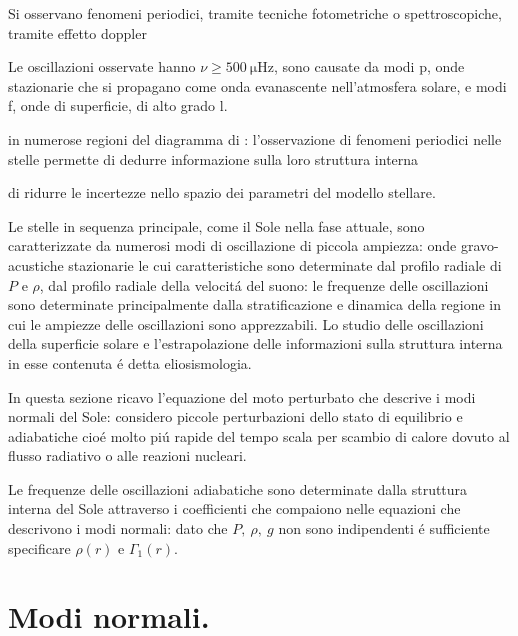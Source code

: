 \documentclass[../main.tex]{subfiles}
\begin{document}
\begin{workout}
Si osservano fenomeni periodici, tramite tecniche fotometriche o spettroscopiche, tramite effetto doppler

Le oscillazioni osservate hanno $\nu\geq\SI{500}{\micro\hertz}$, sono causate da modi p, onde stazionarie che si propagano come onda evanascente nell'atmosfera solare, e modi f, onde di superficie, di alto grado l.

\end{workout}

\begin{workout}
 in numerose regioni del diagramma di \hr{}: l'osservazione di fenomeni periodici nelle stelle permette di dedurre informazione sulla loro struttura interna
\end{workout}

\begin{workout}
  di ridurre le incertezze nello spazio dei parametri del modello stellare.
\end{workout}

Le stelle in sequenza principale, come il Sole nella fase attuale, sono caratterizzate da numerosi modi di oscillazione di piccola ampiezza: onde gravo-acustiche stazionarie le cui caratteristiche sono determinate dal profilo radiale di $P$ e $\rho$, dal profilo radiale della velocit\'a del suono: le frequenze delle oscillazioni sono determinate principalmente dalla stratificazione e dinamica della regione in cui le ampiezze delle oscillazioni sono apprezzabili. Lo studio delle oscillazioni della superficie solare e l'estrapolazione delle informazioni sulla struttura interna in esse contenuta \'e detta eliosismologia.

In questa sezione ricavo l'equazione del moto perturbato che descrive i modi normali del Sole: considero piccole perturbazioni dello stato di equilibrio e adiabatiche cio\'e molto pi\'u rapide del tempo scala per scambio di calore dovuto al flusso radiativo o alle reazioni nucleari.

Le frequenze delle oscillazioni adiabatiche sono determinate dalla struttura interna del Sole attraverso i coefficienti che compaiono nelle equazioni che descrivono i modi normali: dato che $P,\ \rho,\ g$ non sono indipendenti \'e sufficiente specificare $\rho(r)$ e $\Gamma_1(r)$.


{\let\clearpage\relax\let\cleardoublepage\relax
\chapter{Modi normali.}
}
\end{document}
